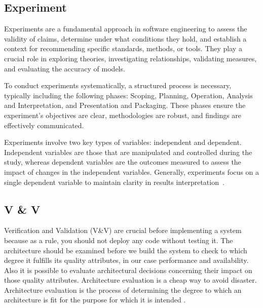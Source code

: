\documentclass[conference]{IEEEtran}
\begin{document}
\subsection{Experiment}
\color{black}
Experiments are a fundamental approach in software engineering to assess the validity of claims, determine under what conditions they hold, and establish a context for recommending specific standards, methods, or tools. They play a crucial role in exploring theories, investigating relationships, validating measures, and evaluating the accuracy of models.

To conduct experiments systematically, a structured process is necessary, typically including the following phases: Scoping, Planning, Operation, Analysis and Interpretation, and Presentation and Packaging. These phases ensure the experiment's objectives are clear, methodologies are robust, and findings are effectively communicated.

Experiments involve two key types of variables: independent and dependent. Independent variables are those that are manipulated and controlled during the study, whereas dependent variables are the outcomes measured to assess the impact of changes in the independent variables. Generally, experiments focus on a single dependent variable to maintain clarity in results interpretation~\cite{b14}.

\subsection{V \& V }
\color{black}

Verification and Validation (V\&V) are crucial before implementing a system because as a rule, you should not deploy any code without testing it. The architecture should be examined before we build the system to check to which degree it fulfills its quality attributes, in our case performance and availability. Also it is possible to evaluate architectural decisions concerning their impact on those quality attributes. Architecture evaluation is a cheap way to avoid disaster. Architecture evaluation is the process of determining the degree to which an architecture is fit for the purpose for which it is intended \cite{b20}. 
\end{document}
